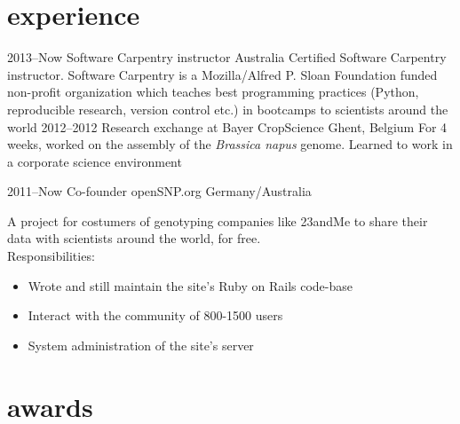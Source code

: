 \documentclass[]{friggeri-cv} %
\begin{document}

\section{experience}

\begin{entrylist}
\entry
{2013--Now}
{Software Carpentry instructor}
{Australia}
{Certified Software Carpentry instructor. Software Carpentry is a Mozilla/Alfred P. Sloan Foundation funded non-profit organization which teaches best programming practices (Python, reproducible research, version control etc.) in bootcamps to scientists around the world}
\entry
{2012--2012}
{Research exchange {\normalfont at Bayer CropScience}}
{Ghent, Belgium}
{For 4 weeks, worked on the assembly of the \textit{Brassica napus} genome. Learned to work in a corporate science environment}

\entry
{2011--Now}
{Co-founder openSNP.org}
{Germany/Australia}
{A project for costumers of genotyping companies like 23andMe to share their data with scientists around the world, for free.\\
Responsibilities:
\begin{itemize}
\item Wrote and still maintain the site's Ruby on Rails code-base
\item Interact with the community of 800-1500 users
\item System administration of the site's server
\end{itemize}}


\end{entrylist}


\section{awards}
\end{document}
